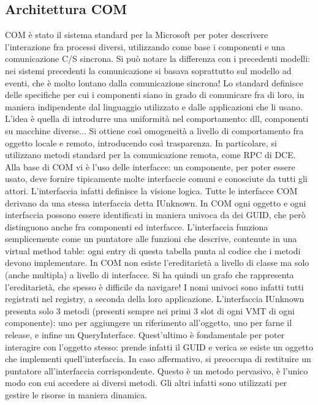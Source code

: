 \subsection{Architettura COM}
COM è stato il sistema standard per la Microsoft per poter descrivere l'interazione fra processi diversi, utilizzando
come base i componenti e una comunicazione C/S sincrona. Si può notare la differenza con i precedenti modelli: nei
sistemi precedenti la comunicazione si basava soprattutto sul modello ad eventi, che è molto lontano dalla comunicazione
sincrona!
Lo standard definisce delle specifiche per cui i componenti siano in grado di comunicare fra di loro, in maniera
indipendente dal linguaggio utilizzato e dalle applicazioni che li usano. L'idea è quella di introdurre una uniformità
nel comportamento: dll, componenti su macchine diverse... Si ottiene così omogeneità a livello di comportamento fra
oggetto locale e remoto, introducendo così trasparenza. In particolare, si utilizzano metodi standard per la
comunicazione remota, come RPC di DCE.
Alla base di COM vi è l'uso delle interfacce: un componente, per poter essere usato, deve fornire tipicamente molte interfaccie comuni
e conosciute da tutti gli attori. L'interfaccia infatti definisce la visione logica. Tutte le interfacce COM
derivano da una stessa interfaccia detta IUnknown. In COM ogni oggetto e ogni interfaccia possono essere identificati in
maniera univoca da dei GUID, che però distinguono anche fra componenti ed interfacce.
L'interfaccia funziona semplicemente come un puntatore alle funzioni che descrive, contenute in una virtual method
table: ogni entry di questa tabella punta al codice che i metodi devono implementare. In COM non esiste l'ereditarietà
a livello di classe ma solo (anche multipla) a livello di interfacce. Si ha quindi un grafo che rappresenta
l'ereditarietà, che spesso è difficile da navigare! I nomi univoci sono infatti tutti registrati nel registry, a seconda
della loro applicazione.
L'interfaccia IUnknown presenta solo 3 metodi (presenti sempre nei primi 3 slot di ogni VMT di ogni componente): uno per
aggiungere un riferimento all'oggetto, uno per farne il release, e infine un QueryInterface. Quest'ultimo è fondamentale
per poter interagire con l'oggetto stesso: prende infatti il GUID e verica se esiste un oggetto che implementi
quell'interfaccia. In caso affermativo, si preoccupa di restituire un puntatore all'interfaccia corrispondente. Questo è
un metodo pervasivo, è l'unico modo con cui accedere ai diversi metodi. Gli altri infatti sono utilizzati per gestire le
risorse in maniera dinamica.
